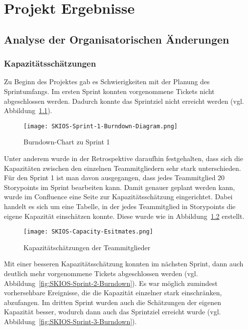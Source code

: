 
\chapter{Projekt Ergebnisse}\label{proj_ergebnisse}

\section{Analyse der Organisatorischen Änderungen}

\subsection{Kapazitätsschätzungen}

Zu Beginn des Projektes gab es Schwierigkeiten mit der Planung des Sprintumfangs.
Im ersten Sprint konnten vorgenommene Tickets nicht abgeschlossen werden. 
Dadurch konnte das Sprintziel nicht erreicht werden (vgl. Abbildung~\ref{fig:SKIOS-Sprint-1-Burndown}).

\begin{figure}[h]
    \texttt{[image: SKIOS-Sprint-1-Burndown-Diagram.png]}
    \caption{Burndown-Chart zu Sprint 1}
    \label{fig:SKIOS-Sprint-1-Burndown}
\end{figure}

Unter anderem wurde in der Retrospektive daraufhin festgehalten, 
dass sich die Kapazitäten zwischen den einzelnen Teammitgliedern sehr stark unterschieden.
Für den Sprint 1 ist man davon ausgegangen, dass jedes Teammitglied 20 Storypoints im Sprint bearbeiten kann.
Damit genauer geplant werden kann, wurde im Confluence eine Seite zur Kapazitätsschätzung eingerichtet.
Dabei handelt es sich um eine Tabelle, in der jedes Teammitglied in Storypoints die eigene Kapazität einschätzen konnte.
Diese wurde wie in Abbildung~\ref{fig:Capacitytable} erstellt. 

\begin{figure}[h]
    \texttt{[image: SKIOS-Capacity-Esitmates.png]}
    \caption{Kapazitätschätzungen der Teammitglieder}
    \label{fig:Capacitytable}
\end{figure}

Mit einer besseren Kapazitätsschätzung konnten im nächsten Sprint, dann auch deutlich mehr vorgenommene Tickets abgeschlossen werden (vgl. Abbildung~\ref{fig:SKIOS-Sprint-2-Burndown}).
Es war möglich zumindest vorhersehbare Ereignisse, die die Kapazität einzelner stark einschränken, abzufangen.
Im dritten Sprint wurden auch die Schätzungen der eigenen Kapazität besser, wodurch dann auch das Sprintziel erreicht wurde (vgl. Abbildung~\ref{fig:SKIOS-Sprint-3-Burndown}).

